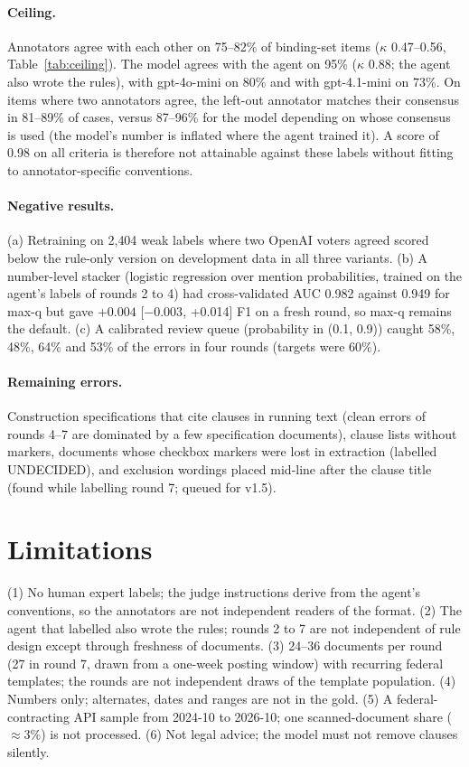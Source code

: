 \documentclass[11pt]{article}
\begin{document}
\paragraph{Ceiling.} Annotators agree with each other on 75--82\% of binding-set items ($\kappa$ 0.47--0.56, Table~\ref{tab:ceiling}). The model agrees with the agent on 95\% ($\kappa$ 0.88; the agent also wrote the rules), with gpt-4o-mini on 80\% and with gpt-4.1-mini on 73\%. On items where two annotators agree, the left-out annotator matches their consensus in 81--89\% of cases, versus 87--96\% for the model depending on whose consensus is used (the model's number is inflated where the agent trained it). A score of 0.98 on all criteria is therefore not attainable against these labels without fitting to annotator-specific conventions.
\begin{table}[h]\centering\small

\caption{Pairwise agreement on binding-set labels pooled over rounds 3 to 6.}\label{tab:ceiling}
\end{table}
\paragraph{Negative results.} (a) Retraining on 2{,}404 weak labels where two OpenAI voters agreed scored below the rule-only version on development data in all three variants. (b) A number-level stacker (logistic regression over mention probabilities, trained on the agent's labels of rounds 2 to 4) had cross-validated AUC 0.982 against 0.949 for max-q but gave $+0.004$ [$-0.003$, +0.014] F1 on a fresh round, so max-q remains the default. (c) A calibrated review queue (probability in (0.1, 0.9)) caught 58\%, 48\%, 64\% and 53\% of the errors in four rounds (targets were 60\%).
\paragraph{Remaining errors.} Construction specifications that cite clauses in running text (clean errors of rounds 4--7 are dominated by a few specification documents), clause lists without markers, documents whose checkbox markers were lost in extraction (labelled UNDECIDED), and exclusion wordings placed mid-line after the clause title (found while labelling round 7; queued for v1.5).

\section{Limitations}
(1) No human expert labels; the judge instructions derive from the agent's conventions, so the annotators are not independent readers of the format. (2) The agent that labelled also wrote the rules; rounds 2 to 7 are not independent of rule design except through freshness of documents. (3) 24--36 documents per round (27 in round 7, drawn from a one-week posting window) with recurring federal templates; the rounds are not independent draws of the template population. (4) Numbers only; alternates, dates and ranges are not in the gold. (5) A federal-contracting API sample from 2024-10 to 2026-10; one scanned-document share ($\approx$3\%) is not processed. (6) Not legal advice; the model must not remove clauses silently.
\end{document}
